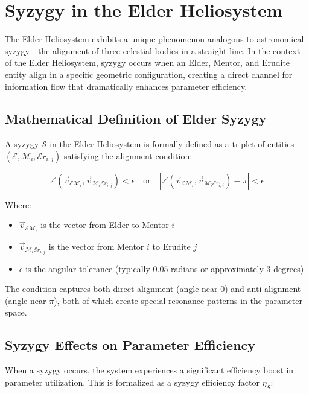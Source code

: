 \section{Syzygy in the Elder Heliosystem}

The Elder Heliosystem exhibits a unique phenomenon analogous to astronomical syzygy—the alignment of three celestial bodies in a straight line. In the context of the Elder Heliosystem, syzygy occurs when an Elder, Mentor, and Erudite entity align in a specific geometric configuration, creating a direct channel for information flow that dramatically enhances parameter efficiency.

\subsection{Mathematical Definition of Elder Syzygy}

A syzygy $\mathcal{S}$ in the Elder Heliosystem is formally defined as a triplet of entities $(\mathcal{E}, \mathcal{M}_i, \mathcal{E}r_{i,j})$ satisfying the alignment condition:

\begin{equation}
\angle(\vec{v}_{\mathcal{E}\mathcal{M}_i}, \vec{v}_{\mathcal{M}_i\mathcal{E}r_{i,j}}) < \epsilon \quad \text{or} \quad |\angle(\vec{v}_{\mathcal{E}\mathcal{M}_i}, \vec{v}_{\mathcal{M}_i\mathcal{E}r_{i,j}}) - \pi| < \epsilon
\end{equation}

Where:
\begin{itemize}
    \item $\vec{v}_{\mathcal{E}\mathcal{M}_i}$ is the vector from Elder to Mentor $i$
    \item $\vec{v}_{\mathcal{M}_i\mathcal{E}r_{i,j}}$ is the vector from Mentor $i$ to Erudite $j$
    \item $\epsilon$ is the angular tolerance (typically $0.05$ radians or approximately $3$ degrees)
\end{itemize}

The condition captures both direct alignment (angle near 0) and anti-alignment (angle near $\pi$), both of which create special resonance patterns in the parameter space.

\subsection{Syzygy Effects on Parameter Efficiency}

When a syzygy occurs, the system experiences a significant efficiency boost in parameter utilization. This is formalized as a syzygy efficiency factor $\eta_\mathcal{S}$:

